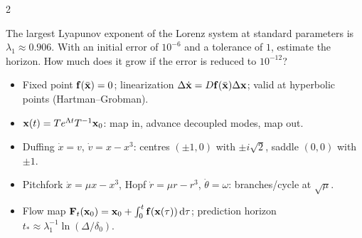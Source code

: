 \begin{paracol}{2}
\begin{exercise}
The largest Lyapunov exponent of the Lorenz system at standard parameters is $\lambda_1\approx0.906$.
With an initial error of $10^{-6}$ and a tolerance of $1$, estimate the horizon. How much does it grow
if the error is reduced to $10^{-12}$?
\end{exercise}

\begin{keyformulas}
\begin{itemize}
  \item Fixed point $\mathbf{f}(\bar{\mathbf{x}})=0$; linearization $\Delta\dot{\mathbf{x}}=D\mathbf{f}(\bar{\mathbf{x}})\Delta\mathbf{x}$;
        valid at hyperbolic points (Hartman--Grobman).
  \item $\mathbf{x}(t)=Te^{\Lambda t}T^{-1}\mathbf{x}_0$: map in, advance decoupled modes, map out.
  \item Duffing $\dot x=v$, $\dot v=x-x^3$: centres $(\pm1,0)$ with $\pm i\sqrt2$, saddle $(0,0)$ with $\pm1$.
  \item Pitchfork $\dot x=\mu x-x^3$, Hopf $\dot r=\mu r-r^3$, $\dot\theta=\omega$: branches/cycle at $\sqrt\mu$.
  \item Flow map $\mathbf{F}_t(\mathbf{x}_0)=\mathbf{x}_0+\int_0^t\mathbf{f}(\mathbf{x}(\tau))\,\mathrm{d}\tau$; prediction horizon
        $t_*\approx\lambda_1^{-1}\ln(\Delta/\delta_0)$.
\end{itemize}
\end{keyformulas}

\end{paracol}

